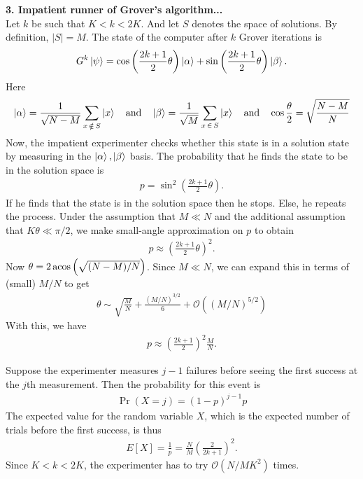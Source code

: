 \documentclass{article}
\theoremstyle{definition}
\newcommand{\al}{\alpha}
\newcommand{\be}{\beta}
\newcommand{\f}[2]{\frac{#1}{#2}}
\newcommand{\lp}{\left(}
\newcommand{\rp}{\right)}
\begin{document}
\newpage

\noindent \textbf{3. Impatient runner of Grover's algorithm...}\\

\noindent Let $k$ be such that $K < k < 2K$. And let $S$ denotes the space of solutions. By definition, $|S| = M$. The state of the computer after $k$ Grover iterations is
\begin{align*}
	G^k \ket{\psi} = \cos\lp \f{2k+1}{2}\theta \rp \ket{\al} + \sin\lp \f{2k+1}{2}\theta \rp \ket{\be}.
\end{align*}
Here
\begin{align*}
	\ket{\al} = \f{1}{\sqrt{N-M}} \sum_{x \,\notin\, S} \ket{x} 
	\quad \text{and} \quad
	\ket{\be} = \f{1}{\sqrt{M}} \sum_{x \,\in\, S } \ket{x} 
	\quad \text{and} \quad \cos\f{\theta}{2} = \sqrt{\f{N-M}{N}}
\end{align*}
Now, the impatient experimenter checks whether this state is in a solution state by measuring in the $\ket{\al}, \ket{\be}$ basis. The probability that he finds the state to be in the solution space is 
\begin{align*}
	p = \sin^2 \lp \f{2k+1}{2} \theta \rp.
\end{align*}
If he finds that the state is in the solution space then he stops. Else, he repeats the process. Under the assumption that $M\ll N$ and the additional assumption that $K\theta \ll \pi/2$, we make small-angle approximation on $p$ to obtain 
\begin{align*}
	p \approx \lp \f{2k+1}{2}\theta \rp^2.
\end{align*}
Now $\theta = 2\acos\lp \sqrt{(N-M)/N} \rp$. Since $M\ll N$, we can expand this in terms of (small) $M/N$ to get
\begin{align*}
	\theta \sim \sqrt{\f{M}{N}} + \f{(M/N)^{3/2}}{6} + \mathcal{O}((M/N)^{5/2})
\end{align*}
With this, we have
\begin{align*}
	p \approx \lp \f{2k+1}{2} \rp^2 \f{M}{N}.
\end{align*}

Suppose the experimenter measures $j-1$ failures before seeing the first success at the $j$th measurement. Then the probability for this event is 
\begin{align*}
	\Pr(X=j) = (1-p)^{j-1}p
\end{align*}
The expected value for the random variable $X$, which is the expected number of trials before the first success, is thus
\begin{align*}
	E[X] = \f{1}{p}  = \f{N}{M} \lp \f{2}{2k+1} \rp ^2.
\end{align*}
Since $K < k < 2K$, the experimenter has to try $\boxed{\mathcal{O}(N/MK^2)}$ times. 
\end{document}
